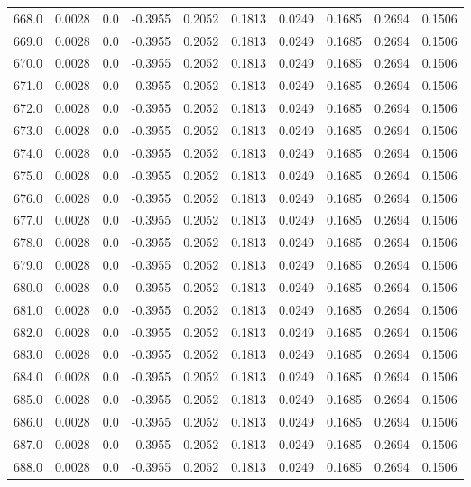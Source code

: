 \begin{longtable}{lrrrrrrrrr}
668.0 & 0.0028 & 0.0 & -0.3955 & 0.2052 & 0.1813 & 0.0249 & 0.1685 & 0.2694 & 0.1506 \\
669.0 & 0.0028 & 0.0 & -0.3955 & 0.2052 & 0.1813 & 0.0249 & 0.1685 & 0.2694 & 0.1506 \\
670.0 & 0.0028 & 0.0 & -0.3955 & 0.2052 & 0.1813 & 0.0249 & 0.1685 & 0.2694 & 0.1506 \\
671.0 & 0.0028 & 0.0 & -0.3955 & 0.2052 & 0.1813 & 0.0249 & 0.1685 & 0.2694 & 0.1506 \\
672.0 & 0.0028 & 0.0 & -0.3955 & 0.2052 & 0.1813 & 0.0249 & 0.1685 & 0.2694 & 0.1506 \\
673.0 & 0.0028 & 0.0 & -0.3955 & 0.2052 & 0.1813 & 0.0249 & 0.1685 & 0.2694 & 0.1506 \\
674.0 & 0.0028 & 0.0 & -0.3955 & 0.2052 & 0.1813 & 0.0249 & 0.1685 & 0.2694 & 0.1506 \\
675.0 & 0.0028 & 0.0 & -0.3955 & 0.2052 & 0.1813 & 0.0249 & 0.1685 & 0.2694 & 0.1506 \\
676.0 & 0.0028 & 0.0 & -0.3955 & 0.2052 & 0.1813 & 0.0249 & 0.1685 & 0.2694 & 0.1506 \\
677.0 & 0.0028 & 0.0 & -0.3955 & 0.2052 & 0.1813 & 0.0249 & 0.1685 & 0.2694 & 0.1506 \\
678.0 & 0.0028 & 0.0 & -0.3955 & 0.2052 & 0.1813 & 0.0249 & 0.1685 & 0.2694 & 0.1506 \\
679.0 & 0.0028 & 0.0 & -0.3955 & 0.2052 & 0.1813 & 0.0249 & 0.1685 & 0.2694 & 0.1506 \\
680.0 & 0.0028 & 0.0 & -0.3955 & 0.2052 & 0.1813 & 0.0249 & 0.1685 & 0.2694 & 0.1506 \\
681.0 & 0.0028 & 0.0 & -0.3955 & 0.2052 & 0.1813 & 0.0249 & 0.1685 & 0.2694 & 0.1506 \\
682.0 & 0.0028 & 0.0 & -0.3955 & 0.2052 & 0.1813 & 0.0249 & 0.1685 & 0.2694 & 0.1506 \\
683.0 & 0.0028 & 0.0 & -0.3955 & 0.2052 & 0.1813 & 0.0249 & 0.1685 & 0.2694 & 0.1506 \\
684.0 & 0.0028 & 0.0 & -0.3955 & 0.2052 & 0.1813 & 0.0249 & 0.1685 & 0.2694 & 0.1506 \\
685.0 & 0.0028 & 0.0 & -0.3955 & 0.2052 & 0.1813 & 0.0249 & 0.1685 & 0.2694 & 0.1506 \\
686.0 & 0.0028 & 0.0 & -0.3955 & 0.2052 & 0.1813 & 0.0249 & 0.1685 & 0.2694 & 0.1506 \\
687.0 & 0.0028 & 0.0 & -0.3955 & 0.2052 & 0.1813 & 0.0249 & 0.1685 & 0.2694 & 0.1506 \\
688.0 & 0.0028 & 0.0 & -0.3955 & 0.2052 & 0.1813 & 0.0249 & 0.1685 & 0.2694 & 0.1506 \\

\end{longtable}
